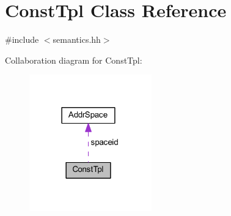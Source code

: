 \hypertarget{class_const_tpl}{}\section{Const\+Tpl Class Reference}
\label{class_const_tpl}


{\ttfamily \#include $<$semantics.\+hh$>$}



Collaboration diagram for Const\+Tpl\+:
\nopagebreak
\begin{figure}[H]
\begin{center}
\leavevmode
\includegraphics[width=150pt]{class_const_tpl__coll__graph}
\end{center}
\end{figure}
